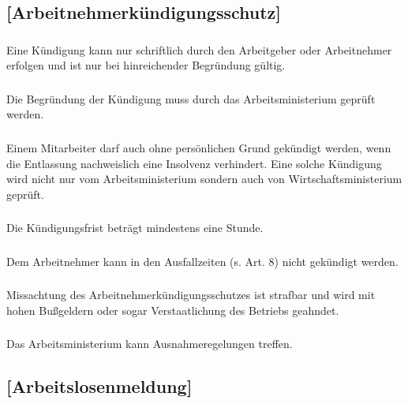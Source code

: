 \documentclass[a4paper, 11pt]{report}
\let\oldsubsection\subsection
\renewcommand{\subsection}{\leftskip=40pt\oldsubsection}
\begin{document}
\subsection{[Arbeitnehmerkündigungsschutz]}

 
\subsubsection{}
Eine Kündigung kann nur schriftlich durch den Arbeitgeber oder Arbeitnehmer erfolgen und ist nur bei hinreichender Begründung gültig. 

\subsubsection{}
Die Begründung der Kündigung muss durch das Arbeitsministerium geprüft werden. 

\subsubsection{}
Einem Mitarbeiter darf auch ohne persönlichen Grund gekündigt werden, wenn die Entlassung nachweislich eine Insolvenz verhindert. Eine solche Kündigung wird nicht nur vom Arbeitsministerium sondern auch von Wirtschaftsministerium geprüft.

\subsubsection{}
Die Kündigungsfrist beträgt mindestens eine Stunde. 

\subsubsection{}
Dem Arbeitnehmer kann in den Ausfallzeiten (s. Art. 8) nicht gekündigt werden. 

\subsubsection{}
Missachtung des Arbeitnehmerkündigungsschutzes ist strafbar und wird mit hohen Bußgeldern oder sogar Verstaatlichung des Betriebs geahndet.

\subsubsection{}
Das Arbeitsministerium kann Ausnahmeregelungen treffen. 


\subsection{[Arbeitslosenmeldung]}
\end{document}
